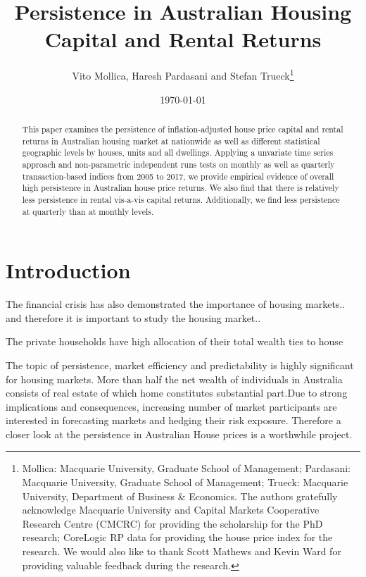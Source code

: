 \documentclass[AEJ,reqno, draftmode]{AEA}
\begin{document}
\title{Persistence in Australian Housing Capital and Rental Returns}
\author{Vito Mollica, Haresh Pardasani and Stefan Trueck\thanks{%
Mollica: Macquarie University, Graduate School of Management; Pardasani: Macquarie University, Graduate School of Management; Trueck: Macquarie University, Department of Business \& Economics. The authors gratefully acknowledge Macquarie University and Capital Markets Cooperative Research Centre (CMCRC) for providing the scholarship for the PhD research; CoreLogic RP data for providing the house price index for the research. We would also like to thank Scott Mathews and Kevin Ward for providing valuable feedback during the research.}}
\date{\today}
\pubVolume{}
\pubIssue{}
\JEL{}

\begin{abstract}
This paper examines the persistence of inflation-adjusted house price capital and rental returns in Australian housing market at nationwide as well as different statistical geographic levels by houses, units and all dwellings. Applying a unvariate time series approach and non-parametric independent runs tests on monthly as well as quarterly transaction-based indices from 2005 to 2017, we provide empirical evidence of overall high persistence in Australian house price returns. We also find that there is relatively less persistence in rental vis-a-vis capital returns. Additionally, we find less persistence at quarterly than at monthly levels. \\

\end{abstract}

\maketitle



\section{Introduction}


The financial crisis has also demonstrated the importance of housing markets.. and therefore it is important to study the housing market..

The private households have high allocation of their total wealth ties to house

The topic of persistence, market efficiency and predictability is highly significant for housing markets. More than half the net wealth of individuals in Australia consists of real estate of which home constitutes substantial part.Due to strong implications and consequences, increasing number of market participants are interested in forecasting markets and hedging their risk exposure. Therefore a closer look at the persistence in Australian House prices is a worthwhile project.
\end{document}
